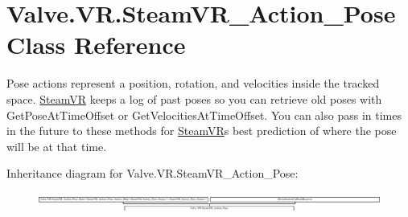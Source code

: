 \hypertarget{class_valve_1_1_v_r_1_1_steam_v_r___action___pose}{}\section{Valve.\+V\+R.\+Steam\+V\+R\+\_\+\+Action\+\_\+\+Pose Class Reference}
\label{class_valve_1_1_v_r_1_1_steam_v_r___action___pose}


Pose actions represent a position, rotation, and velocities inside the tracked space. \mbox{\hyperlink{class_valve_1_1_v_r_1_1_steam_v_r}{Steam\+VR}} keeps a log of past poses so you can retrieve old poses with Get\+Pose\+At\+Time\+Offset or Get\+Velocities\+At\+Time\+Offset. You can also pass in times in the future to these methods for \mbox{\hyperlink{class_valve_1_1_v_r_1_1_steam_v_r}{Steam\+VR}}\textquotesingle{}s best prediction of where the pose will be at that time.  


Inheritance diagram for Valve.\+V\+R.\+Steam\+V\+R\+\_\+\+Action\+\_\+\+Pose\+:\begin{figure}[H]
\begin{center}
\leavevmode
\includegraphics[height=0.649652cm]{class_valve_1_1_v_r_1_1_steam_v_r___action___pose}
\end{center}
\end{figure}
